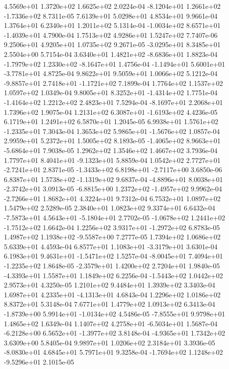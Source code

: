 4.5569e+01 1.3720e+02 1.6625e+02  2.0224e-04
-8.1204e+01  1.2661e+02 -1.7336e+02  8.7311e-05
7.6139e+01 5.0298e+01 4.8534e+01  9.9661e-04
1.3764e+01 6.2340e+01 1.2011e+02  5.1314e-04
-1.0034e+02  8.6571e+01 -1.4039e+01  4.7900e-04
1.7513e+02 4.9286e+01 1.5247e+02  7.7407e-06
9.2506e+01 4.9205e+01 1.0735e+02  9.2671e-05
-3.0295e+01  8.3485e+01  2.5504e+00  5.7154e-04
 3.6340e+01  1.4821e+02 -8.6836e+01  1.8823e-04
-1.7979e+02  1.2330e+02 -8.1647e+01  1.4756e-04
-1.1494e+01  5.6001e+01 -3.7781e+01  4.8725e-04
9.8622e+01 9.5059e+01 1.0066e+02  5.1212e-04
-9.8857e+01  2.7418e+01 -1.1721e+02  7.1899e-04
1.7764e+02 1.1537e+02 1.0597e+02  1.0349e-04
 9.8005e+01  8.3252e+01 -1.4314e+02  1.7751e-04
-1.4164e+02  1.2212e+02  2.4823e+01  7.5294e-04
-8.1697e+01  2.2068e+01  1.7396e+02  1.9075e-04
 1.2131e+02  6.3087e+01 -1.6193e+02  4.4236e-05
6.1719e+01 1.2491e+02 6.5870e+01  1.2045e-05
 6.9938e+01  1.5761e+02 -1.2335e+01  7.3043e-04
 1.3653e+02  5.9865e+01 -1.5676e+02  1.0857e-04
2.9959e+01 5.2372e+01 1.5005e+02  8.1893e-05
-1.4065e+02  8.9663e+01 -5.6864e+01  7.9038e-05
1.2962e+02 1.3546e+02 1.4667e+02  3.7936e-04
 1.7797e+01  8.4041e+01 -9.1323e+01  5.8859e-04
 1.0542e+02  2.7727e+01 -2.7241e+01  2.8371e-05
-1.3433e+02  6.8198e+01 -2.7117e+00  3.6850e-06
 6.8387e+01  1.5738e+02 -1.1319e+02  9.6837e-04
-4.8896e+01  8.0038e+01 -2.3742e+01  3.0913e-05
-6.8815e+00  1.2372e+02 -1.4957e+02  9.9962e-04
-2.7266e+01  1.8682e+01  4.3224e+01  9.7312e-04
6.7532e+01 1.0897e+02 1.5479e+02  2.5289e-05
2.3840e+01 1.0823e+02 9.3374e+01  6.6432e-04
-7.5873e+01  4.5643e+01 -5.1804e+01  2.7702e-05
-1.0678e+02  1.2441e+02 -1.7512e+02  1.6642e-04
 1.2256e+02  3.9317e+01 -1.2972e+02  6.8783e-05
 1.4987e+02  1.1938e+02 -9.5587e+00  7.2777e-05
1.7394e+02 1.0686e+02 5.6339e+01  4.4593e-04
 6.8577e+01  1.1083e+01 -3.3179e+01  3.6301e-04
 6.1983e+01  9.4631e+01 -1.5471e+02  1.5257e-04
-8.0045e+01  7.4094e+01 -1.2235e+02  1.8648e-05
-2.3579e+01  1.4200e+02  2.7204e+01  1.9840e-05
-4.3393e+01  1.5587e+01  1.1849e+02  6.2256e-04
-1.5443e+02  1.0442e+02  2.9573e+01  4.3250e-05
1.2101e+02 9.4484e+01 1.3939e+02  3.3403e-04
 1.6987e+01  4.2335e+01 -4.1313e+01  4.6843e-04
1.2296e+02 1.0186e+02 8.8372e+01  5.3148e-04
7.6771e+01 1.4779e+02 1.0913e+02  6.3413e-04
-1.8739e+00  5.9914e+01 -1.0134e+02  4.5486e-05
-7.8555e+01  9.9798e+01  1.4865e+02  1.6349e-04
 1.1407e+02  4.2758e+01 -6.5034e+01  1.5687e-04
-6.2128e+00  6.5652e+01 -1.3977e+02  3.8148e-04
-4.9365e+01  1.7342e+02  3.6309e+00  5.8405e-04
9.9897e+01 1.0206e+02 2.3184e+01  3.3936e-05
-8.0830e+01  4.6845e+01  5.7971e+01  9.3258e-04
-1.7694e+02  1.1248e+02 -9.5296e+01  2.1015e-05
